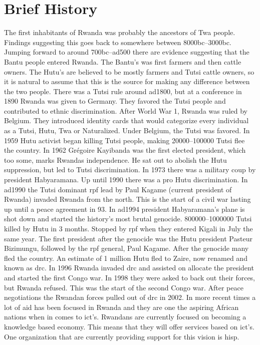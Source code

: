 \section{Brief History}
The first inhabitants of Rwanda was probably the ancestors of Twa people. 
Findings suggesting this goes back to somewhere between 8000\gls{bc}--3000\gls{bc}. 
Jumping forward to around 700\gls{bc}--\gls{ad}500 there are evidence suggesting that the Bantu people entered Rwanda. 
The Bantu's was first farmers and then cattle owners. 
The Hutu's are believed to be mostly farmers and Tutsi cattle owners, so it is natural to assume that this is the source for making any difference between the two people. 
There was a Tutsi rule around \gls{ad}1800, but at a conference in 1890 Rwanda was given to Germany. 
They favored the Tutsi people and contributed to ethnic discrimination. 
After World War 1, Rwanda was ruled by Belgium. 
They introduced identity cards that would categorize every individual as a Tutsi, Hutu, Twa or Naturalized. 
Under Belgium, the Tutsi was favored. 
In 1959 Hutu activist began killing Tutsi people, making 20000--100000 Tutsi flee the country. 
In 1962 Grégoire Kayibanda was the first elected president, which too some, marks Rwandas independence. 
He sat out to abolish the Hutu suppression, but led to Tutsi discrimination. 
In 1973 there was a military coup by president Habyaramana. 
Up until 1990 there was a pro Hutu discrimination. 
In \gls{ad}1990 the Tutsi dominant \gls{rpf} lead by Paul Kagame (current president of Rwanda) invaded Rwanda from the north. 
This is the start of a civil war lasting up until a peace agreement in 93. 
In \gls{ad}1994 president Habyaramana's plane is shot down and started the history's most brutal genocide. 
800000--1000000 Tutsi killed by Hutu in 3 months. 
Stopped by \gls{rpf} when they entered Kigali in July the same year. 
The first president after the genocide was the Hutu president Pasteur Bizimungu, followed by the \gls{rpf} general, Paul Kagame. 
After the genocide many fled the country. 
An estimate of 1 million Hutu fled to Zaire, now renamed and known as \gls{drc}. 
In 1996 Rwanda invaded \gls{drc} and assisted on allocate the president and started the first Congo war. 
In 1998 they were asked to back out their forces, but Rwanda refused. 
This was the start of the second Congo war. 
After peace negotiations the Rwandan forces pulled out of \gls{drc} in 2002.
In more recent times a lot of aid has been focused in Rwanda and they are one the aspiring African nations when in comes to \gls{ict}'s.
Rwandans are currently focused on becoming a knowledge based economy. 
This means that they will offer services based on \gls{ict}'s.
One organization that are currently providing support for this vision is \gls{hisp}.
\cite{rw:snl}
\cite{rw:wiki}
\cite{hutututsi:wiki}

